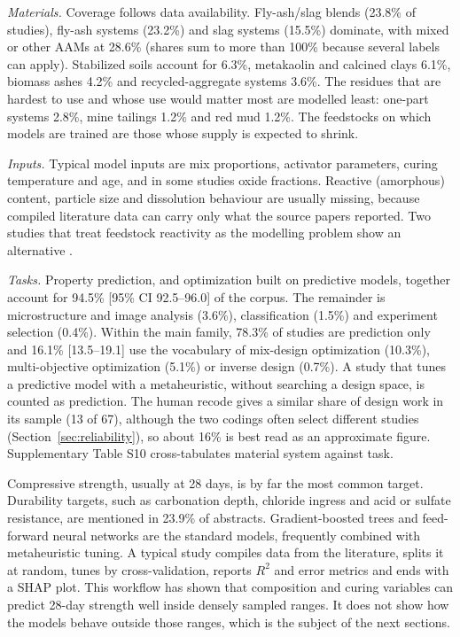 \documentclass[pdflatex,sn-basic]{sn-jnl}
\begin{document}
\emph{Materials.} Coverage follows data availability. Fly-ash/slag blends (23.8\% of studies), fly-ash systems (23.2\%) and slag systems (15.5\%) dominate, with mixed or other AAMs at 28.6\% (shares sum to more than 100\% because several labels can apply). Stabilized soils account for 6.3\%, metakaolin and calcined clays 6.1\%, biomass ashes 4.2\% and recycled-aggregate systems 3.6\%. The residues that are hardest to use and whose use would matter most are modelled least: one-part systems 2.8\%, mine tailings 1.2\% and red mud 1.2\%. The feedstocks on which models are trained are those whose supply is expected to shrink.

\emph{Inputs.} Typical model inputs are mix proportions, activator parameters, curing temperature and age, and in some studies oxide fractions. Reactive (amorphous) content, particle size and dissolution behaviour are usually missing, because compiled literature data can carry only what the source papers reported. Two studies that treat feedstock reactivity as the modelling problem show an alternative \citep{song2025,qi2022}.

\emph{Tasks.} Property prediction, and optimization built on predictive models, together account for 94.5\% [95\% CI 92.5--96.0] of the corpus. The remainder is microstructure and image analysis (3.6\%), classification (1.5\%) and experiment selection (0.4\%). Within the main family, 78.3\% of studies are prediction only and 16.1\% [13.5--19.1] use the vocabulary of mix-design optimization (10.3\%), multi-objective optimization (5.1\%) or inverse design (0.7\%). A study that tunes a predictive model with a metaheuristic, without searching a design space, is counted as prediction. The human recode gives a similar share of design work in its sample (13 of 67), although the two codings often select different studies (Section~\ref{sec:reliability}), so about 16\% is best read as an approximate figure. Supplementary Table S10 cross-tabulates material system against task.

Compressive strength, usually at 28 days, is by far the most common target. Durability targets, such as carbonation depth, chloride ingress and acid or sulfate resistance, are mentioned in 23.9\% of abstracts. Gradient-boosted trees and feed-forward neural networks are the standard models, frequently combined with metaheuristic tuning. A typical study compiles data from the literature, splits it at random, tunes by cross-validation, reports $R^2$ and error metrics and ends with a SHAP plot. This workflow has shown that composition and curing variables can predict 28-day strength well inside densely sampled ranges. It does not show how the models behave outside those ranges, which is the subject of the next sections.
\end{document}
